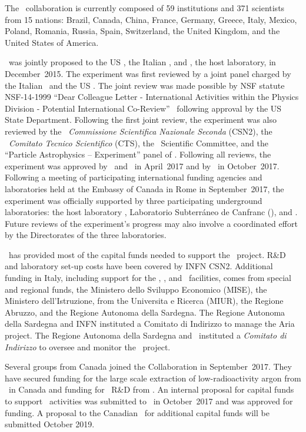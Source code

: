 The \GADMC\ collaboration is currently composed of \num{59} institutions and \num{371} scientists from 15 nations: Brazil, Canada, China, France, Germany, Greece, Italy, Mexico, Poland, Romania, Russia, Spain, Switzerland, the United Kingdom, and the United States of America.

\DSks\ was jointly proposed to the US \NSF, the Italian \INFN, and \LNGS, the host laboratory, in December~2015.  The experiment was first reviewed by a joint panel charged by the Italian \INFN\ and the US \NSF.  The joint review was made possible by NSF statute NSF-14-1999 ``Dear Colleague Letter - International Activities within the Physics Division - Potential International Co-Review''~\cite{USNationalScienceFoundation:2014vy} following approval by the US State Department.  Following the first joint review, the experiment was also reviewed by the \INFN\ {\it Commissione Scientifica Nazionale Seconda} (CSN2), the \INFN\ {\it Comitato Tecnico Scientifico} (CTS),  the \LNGS\ Scientific Committee, and the ``Particle Astrophysics -- Experiment'' panel of \NSF.  Following all reviews, the experiment was approved by \INFN\ and \LNGS\ in April~2017 and by \NSF\ in October~2017.  Following a meeting of participating international funding agencies and laboratories held at the Embassy of Canada in Rome in September~2017, the experiment was officially supported by three participating underground laboratories: the host laboratory \LNGS, Laboratorio Subterr\'aneo de Canfranc (\LSC), and \SNOLAB.  Future reviews of the experiment's progress may also involve a coordinated effort by the Directorates of the three laboratories.

\INFN\ has provided most of the capital funds needed to support the \DSks\ project. R\&D and laboratory set-up costs have been covered by INFN CSN2. Additional funding in Italy, including support for the \Urania, \Aria, and \NOA\ facilities, comes from special and regional funds, the Ministero dello Sviluppo Economico (MISE), the Ministero dell'Istruzione, from the Universita e Ricerca (MIUR), the Regione Abruzzo, and the Regione Autonoma della Sardegna.  The Regione Autonoma della Sardegna and INFN instituted a Comitato di Indirizzo to manage the Aria project.  The Regione Autonoma della Sardegna and \INFN\ instituted a {\it Comitato di Indirizzo} to oversee and monitor the \Aria\ project.

Several groups from Canada joined the Collaboration in September~2017. They have secured funding for the large scale extraction of low-radioactivity argon from \CFI\ in Canada and funding for \DEAP\ R\&D from \NSERC.  An internal proposal for capital funds to support \DSks\ activities was submitted to \TRIUMF\ in October~2017 and was approved for funding.  A proposal to the Canadian \CFI\ for additional capital funds will be submitted October 2019.


